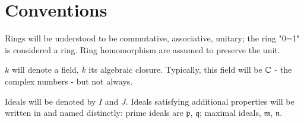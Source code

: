 \section{Conventions}


Rings will be understood to be commutative, associative, unitary; the ring "0=1" is considered a ring. Ring homomorphism are assumed to preserve the unit.

$k$ will denote a field, $\bar k$ its algebraic closure. Typically, this field will be $\mathbb C$ - the complex numbers - but not always.

Ideals will be denoted by $I$ and $J$. Ideals satisfying additional properties will be written in  and named distinctly: prime ideals are $\mathfrak p$, $\mathfrak q$; maximal ideals, $\mathfrak m$, $\mathfrak n$.


